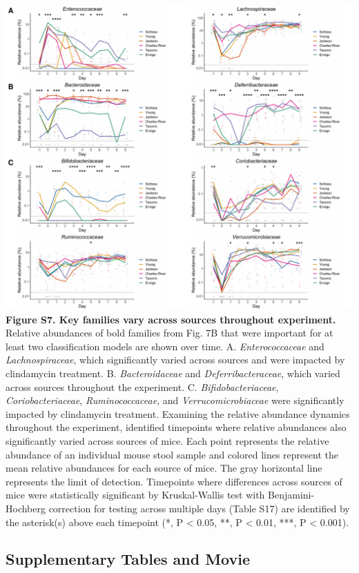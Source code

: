 \documentclass[11pt,]{article}
\begin{document}
\includegraphics{figure_S7.pdf} \textbf{Figure S7. Key families vary
across sources throughout experiment.} Relative abundances of bold
families from Fig. 7B that were important for at least two
classification models are shown over time. A. \emph{Enterococcaceae} and
\emph{Lachnospiraceae}, which significantly varied across sources and
were impacted by clindamycin treatment. B. \emph{Bacteroidaceae} and
\emph{Deferribacteraceae}, which varied across sources throughout the
experiment. C. \emph{Bifidobacteriaceae}, \emph{Coriobacteriaceae},
\emph{Ruminococcaceae}, and \emph{Verrucomicrobiaceae} were
significantly impacted by clindamycin treatment. Examining the relative
abundance dynamics throughout the experiment, identified timepoints
where relative abundances also significantly varied across sources of
mice. Each point represents the relative abundance of an individual
mouse stool sample and colored lines represent the mean relative
abundances for each source of mice. The gray horizontal line represents
the limit of detection. Timepoints where differences across sources of
mice were statistically significant by Kruskal-Wallis test with
Benjamini-Hochberg correction for testing across multiple days (Table
S17) are identified by the asterisk(s) above each timepoint (*, P
\textless{} 0.05, **, P \textless{} 0.01, ***, P \textless{} 0.001).

\newpage

\subsection{Supplementary Tables and
Movie}\label{supplementary-tables-and-movie}
\end{document}
